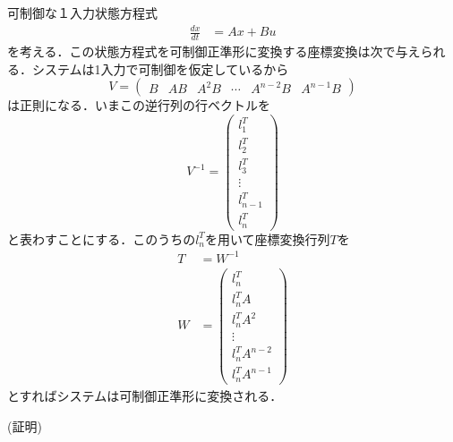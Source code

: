 可制御な１入力状態方程式
\begin{align}
 \frac{dx}{dt} &= Ax + Bu
\nonumber
\end{align}
を考える．この状態方程式を可制御正準形に変換する座標変換は次で与えられる．システムは1入力で可制御を仮定しているから
\begin{equation}
 V = \left(\begin{array}{cccccc}
            B & A B & A^2 B & \cdots & A^{n-2} B & A^{n-1} B
	   \end{array}\right)
\end{equation}
は正則になる．いまこの逆行列の行ベクトルを
\begin{equation}
 V^{-1} = \left(\begin{array}{c}
	     l_1^T \\
		 l_2^T \\
		 l_3^T \\
		 \vdots \\
		 l_{n-1}^T \\
		 l_n^T
		\end{array}\right)
\end{equation}
と表わすことにする．このうちの$l_n^T$を用いて座標変換行列$T$を
\begin{align}
 T &= W^{-1} \\
 W &= \left(\begin{array}{c}
	      l_n^T     \\
	      l_n^T A   \\
	      l_n^T A^2 \\
	      \vdots    \\
	      l_n^T A^{n-2} \\
	      l_n^T A^{n-1}
	     \end{array}\right)
\end{align}
とすればシステムは可制御正準形に変換される．


\noindent
(証明)

